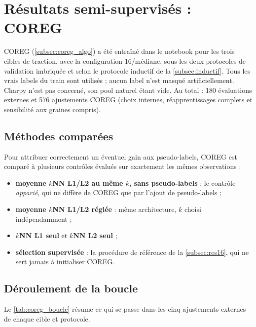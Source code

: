 \clearpage
\section{Résultats semi-supervisés : COREG}
\label{sec:ssl}

COREG (\cref{subsec:coreg_algo}) a été entraîné dans le notebook
 pour les trois cibles de traction, avec la
configuration 16/médiane, sous les deux protocoles de validation imbriquée et selon
le protocole inductif de la \cref{subsec:inductif}. Tous les vrais labels du train
sont utilisés ; aucun label n'est masqué artificiellement. Charpy n'est pas
concerné, son pool naturel étant vide. Au total : 180 évaluations externes et
576 ajustements COREG (choix internes, réapprentissages complets et sensibilité
aux graines compris).

\subsection{Méthodes comparées}

Pour attribuer correctement un éventuel gain aux pseudo-labels, COREG est comparé
à plusieurs contrôles évalués sur exactement les mêmes observations :
\begin{itemize}
  \item \textbf{moyenne $k$NN L1/L2 au même $k$, sans pseudo-labels} : le contrôle \emph{apparié}, qui ne diffère de COREG que par l'ajout de pseudo-labels ;
  \item \textbf{moyenne $k$NN L1/L2 réglée} : même architecture, $k$ choisi indépendamment ;
  \item \textbf{$k$NN L1 seul} et \textbf{$k$NN L2 seul} ;
  \item \textbf{sélection supervisée} : la procédure de référence de la \cref{subsec:res16}, qui ne sert jamais à initialiser COREG.
\end{itemize}

\subsection{Déroulement de la boucle}

Le \cref{tab:coreg_boucle} résume ce qui se passe dans les cinq ajustements
externes de chaque cible et protocole.

